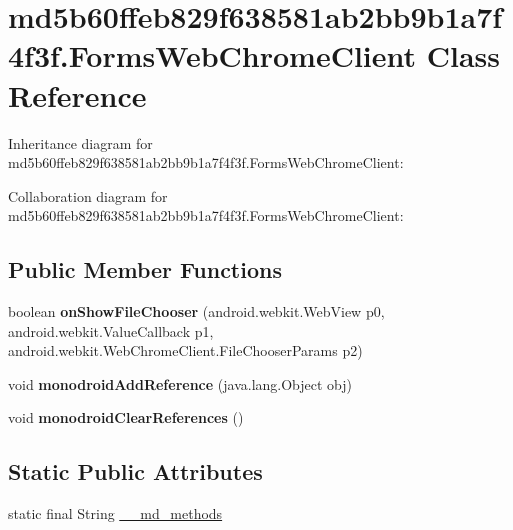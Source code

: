 \hypertarget{classmd5b60ffeb829f638581ab2bb9b1a7f4f3f_1_1_forms_web_chrome_client}{}\section{md5b60ffeb829f638581ab2bb9b1a7f4f3f.\+Forms\+Web\+Chrome\+Client Class Reference}
\label{classmd5b60ffeb829f638581ab2bb9b1a7f4f3f_1_1_forms_web_chrome_client}


Inheritance diagram for md5b60ffeb829f638581ab2bb9b1a7f4f3f.\+Forms\+Web\+Chrome\+Client\+:


Collaboration diagram for md5b60ffeb829f638581ab2bb9b1a7f4f3f.\+Forms\+Web\+Chrome\+Client\+:
\subsection*{Public Member Functions}
\begin{DoxyCompactItemize}
\item 
\mbox{\label{classmd5b60ffeb829f638581ab2bb9b1a7f4f3f_1_1_forms_web_chrome_client_a870ec31fb8f8d9e959487609161690fc}} 
boolean {\bfseries on\+Show\+File\+Chooser} (android.\+webkit.\+Web\+View p0, android.\+webkit.\+Value\+Callback p1, android.\+webkit.\+Web\+Chrome\+Client.\+File\+Chooser\+Params p2)
\item 
\mbox{\label{classmd5b60ffeb829f638581ab2bb9b1a7f4f3f_1_1_forms_web_chrome_client_a9a31a7d0228c24952476bc4cfc6e78df}} 
void {\bfseries monodroid\+Add\+Reference} (java.\+lang.\+Object obj)
\item 
\mbox{\label{classmd5b60ffeb829f638581ab2bb9b1a7f4f3f_1_1_forms_web_chrome_client_ae810253c0c2adc00084f02ce56257c9c}} 
void {\bfseries monodroid\+Clear\+References} ()
\end{DoxyCompactItemize}
\subsection*{Static Public Attributes}
\begin{DoxyCompactItemize}
\item 
static final String \hyperlink{classmd5b60ffeb829f638581ab2bb9b1a7f4f3f_1_1_forms_web_chrome_client_acdbbbfa40f7a32b9cc6eaabbd04669e5}{\+\_\+\+\_\+md\+\_\+methods}
\end{DoxyCompactItemize}


